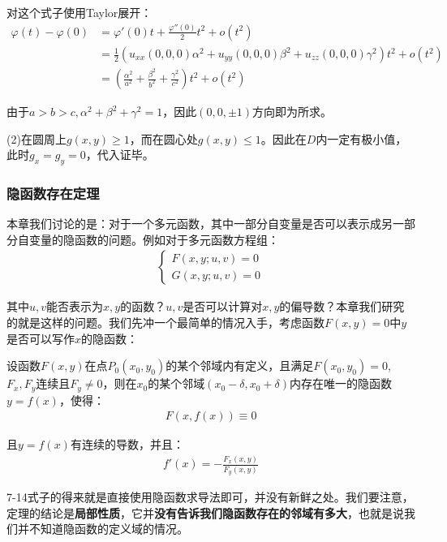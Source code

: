 \documentclass{ctexart}
\let\oldtextbf\textbf %
\renewcommand{\textbf}[1]{\textcolor{btex}{\oldtextbf{#1}}} %
\begin{document}
对这个式子使用Taylor展开：
\begin{align*}
    \varphi(t)-\varphi(0)&=\varphi'(0)t+\frac{\varphi''(0)}{2}t^2+o(t^2)\\
    &=\frac{1}{2}(u_{xx}(0,0,0)\alpha^2+u_{yy}(0,0,0)\beta^2+u_{zz}(0,0,0)\gamma^2)t^2+o(t^2)\\
    &=(\frac{\alpha^2}{a^2}+\frac{\beta^2}{b^2}+\frac{\gamma^2}{c^2})t^2+o(t^2)
\end{align*}

由于$a>b>c,\alpha^2+\beta^2+\gamma^2=1$，因此$(0,0,\pm 1)$方向即为所求。

(2)在圆周上$g(x,y)\geq 1$，而在圆心处$g(x,y)\leq 1$。因此在$D$内一定有极小值，此时$g_x=g_y=0$，代入证毕。

\subsubsection{隐函数存在定理}
本章我们讨论的是：对于一个多元函数，其中一部分自变量是否可以表示成另一部分自变量的隐函数的问题。例如对于多元函数方程组：
\begin{align*}
    \begin{cases}
        F(x,y;u,v)=0\\
        G(x,y;u,v)=0
    \end{cases}
\end{align*}

其中$u,v$能否表示为$x,y$的函数？$u,v$是否可以计算对$x,y$的偏导数？本章我们研究的就是这样的问题。我们先冲一个最简单的情况入手，考虑函数$F(x,y)=0$中$y$是否可以写作$x$的隐函数：
\begin{tcolorbox}[
    colback=bac1,     %
    colframe=fra1,   %
    coltitle=white,             %
    coltext=tex1,
    title=隐函数存在定理（1方程，2未知数）,
    fonttitle=\bfseries,        %
arc=3mm,                     %
breakable
]
设函数$F(x,y)$在点$P_0(x_0,y_0)$的某个邻域内有定义，且满足$F(x_0,y_0)=0$,$F_x,F_y$连续且$F_y\neq 0$，则在$x_0$的某个邻域$(x_0-\delta,x_0+\delta)$内存在唯一的隐函数$y=f(x)$，使得：
\begin{align*}
    F(x,f(x))\equiv 0
\end{align*}

且$y=f(x)$有连续的导数，并且：
\begin{align*}
    f'(x)=-\frac{F_x(x,y)}{F_y(x,y)}\tag{7-14}
\end{align*}
\end{tcolorbox}

7-14式子的得来就是直接使用隐函数求导法即可，并没有新鲜之处。我们要注意，定理的结论是\textbf{局部性质}，它并\textbf{没有告诉我们隐函数存在的邻域有多大}，也就是说我们并不知道隐函数的定义域的情况。
\end{document}
